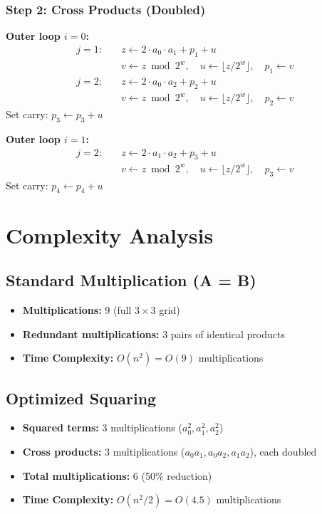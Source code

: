 \documentclass{article}
\begin{document}
\subsubsection{Step 2: Cross Products (Doubled)}
\textbf{Outer loop $i = 0$:}
\begin{align*}
j = 1: \quad & z \leftarrow 2 \cdot a_0 \cdot a_1 + p_1 + u \\
& v \leftarrow z \bmod 2^w, \quad u \leftarrow \lfloor z/2^w \rfloor, \quad p_1 \leftarrow v \\[0.5em]
j = 2: \quad & z \leftarrow 2 \cdot a_0 \cdot a_2 + p_2 + u \\
& v \leftarrow z \bmod 2^w, \quad u \leftarrow \lfloor z/2^w \rfloor, \quad p_2 \leftarrow v
\end{align*}
Set carry: $p_3 \leftarrow p_3 + u$

\textbf{Outer loop $i = 1$:}
\begin{align*}
j = 2: \quad & z \leftarrow 2 \cdot a_1 \cdot a_2 + p_3 + u \\
& v \leftarrow z \bmod 2^w, \quad u \leftarrow \lfloor z/2^w \rfloor, \quad p_3 \leftarrow v
\end{align*}
Set carry: $p_4 \leftarrow p_4 + u$

\section{Complexity Analysis}

\subsection{Standard Multiplication (A = B)}
\begin{itemize}
    \item \textbf{Multiplications:} 9 (full $3 \times 3$ grid)
    \item \textbf{Redundant multiplications:} 3 pairs of identical products
    \item \textbf{Time Complexity:} $O(n^2) = O(9)$ multiplications
\end{itemize}

\subsection{Optimized Squaring}
\begin{itemize}
    \item \textbf{Squared terms:} 3 multiplications ($a_0^2, a_1^2, a_2^2$)
    \item \textbf{Cross products:} 3 multiplications ($a_0a_1, a_0a_2, a_1a_2$), each doubled
    \item \textbf{Total multiplications:} 6 (50\% reduction)
    \item \textbf{Time Complexity:} $O(n^2/2) = O(4.5)$ multiplications
\end{itemize}
\end{document}
